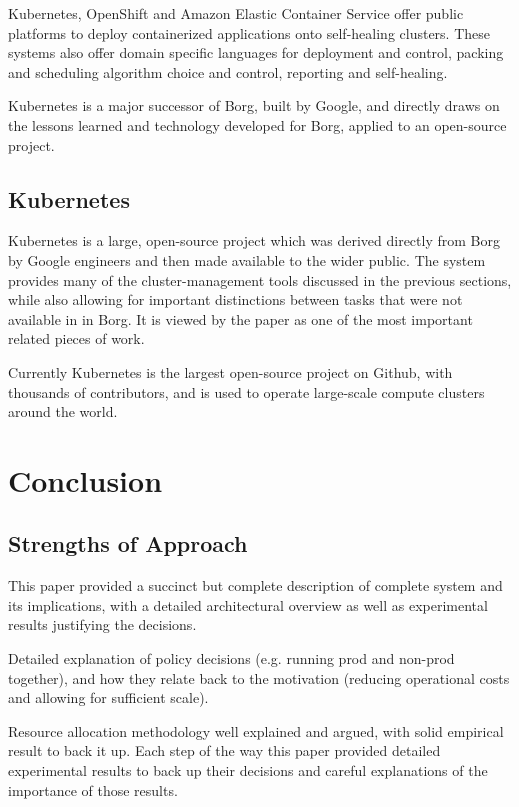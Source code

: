 \documentclass[runningheads,a4paper]{llncs}
\begin{document}
Kubernetes, OpenShift and Amazon Elastic Container Service offer public platforms to deploy containerized applications onto self-healing clusters.  These systems also offer domain specific languages for deployment and control, packing and scheduling algorithm choice and control, reporting and self-healing. 

Kubernetes is a major successor of Borg, built by Google, and directly draws on the lessons learned and technology developed for Borg, applied to an open-source project.  

\subsection{Kubernetes}
Kubernetes is a large, open-source project which was derived directly from Borg by Google engineers and then made available to the wider public.  The system provides many of the cluster-management tools discussed in the previous sections, while also allowing for important distinctions between tasks that were not available in in Borg.  It is viewed by the paper as one of the most important related pieces of work.

Currently Kubernetes is the largest open-source project on Github, with thousands of contributors, and is used to operate large-scale compute clusters around the world.

\section{Conclusion}

\subsection{Strengths of Approach}
This paper provided a succinct but complete description of complete system and its implications, with a detailed architectural overview as well as experimental results justifying the decisions. 

Detailed explanation of policy decisions (e.g. running prod and non-prod together), and how they relate back to the motivation (reducing operational costs and allowing for sufficient scale).

Resource allocation methodology well explained and argued, with solid empirical result to back it up.  Each step of the way this paper provided detailed experimental results to back up their decisions and careful explanations of the importance of those results.  
\end{document}
